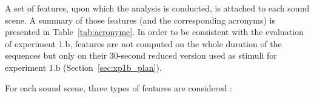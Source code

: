 \documentclass[12pt]{elsarticle}
\newcommand{\eg}{\emph{e.\,g.}}
\begin{document}
A set of features, upon which the analysis is conducted, is attached to each sound scene. A summary of those features (and the corresponding acronyms) is presented in Table~\ref{tab:acronyme}. In order to be consistent with the evaluation of experiment 1.b, features are not computed on the whole duration of the sequences but only on their 30-second reduced version used as stimuli for experiment 1.b (Section~\ref{sec:xp1b_plan}).


For each sound scene, three types of features are considered :


\end{document}
